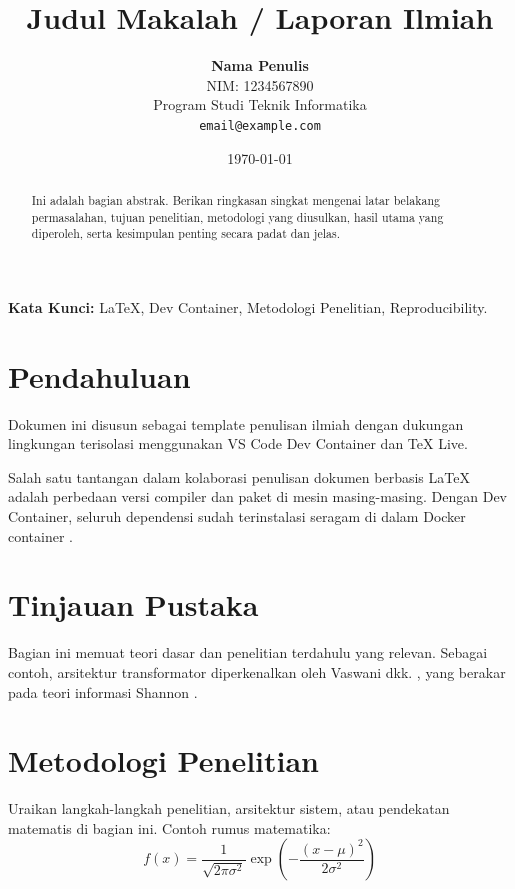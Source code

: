 \documentclass[12pt,a4paper]{article}
\title{\textbf{Judul Makalah / Laporan Ilmiah}}
\author{
    \textbf{Nama Penulis} \\
    NIM: 1234567890 \\
    Program Studi Teknik Informatika \\
    \texttt{email@example.com}
}
\date{\today}
\begin{document}
\maketitle

\begin{abstract}
Ini adalah bagian abstrak. Berikan ringkasan singkat mengenai latar belakang permasalahan, tujuan penelitian, metodologi yang diusulkan, hasil utama yang diperoleh, serta kesimpulan penting secara padat dan jelas.
\end{abstract}

\textbf{Kata Kunci:} LaTeX, Dev Container, Metodologi Penelitian, Reproducibility.

\section{Pendahuluan}
Dokumen ini disusun sebagai template penulisan ilmiah dengan dukungan lingkungan terisolasi menggunakan VS Code Dev Container dan TeX Live.

Salah satu tantangan dalam kolaborasi penulisan dokumen berbasis \LaTeX{} adalah perbedaan versi compiler dan paket di mesin masing-masing. Dengan Dev Container, seluruh dependensi sudah terinstalasi seragam di dalam Docker container \cite{knuth1984texbook}.

\section{Tinjauan Pustaka}
Bagian ini memuat teori dasar dan penelitian terdahulu yang relevan. Sebagai contoh, arsitektur transformator diperkenalkan oleh Vaswani dkk. \cite{vaswani2017attention}, yang berakar pada teori informasi Shannon \cite{shannon1948mathematical}.

\section{Metodologi Penelitian}
Uraikan langkah-langkah penelitian, arsitektur sistem, atau pendekatan matematis di bagian ini. Contoh rumus matematika:
\begin{equation}
    f(x) = \frac{1}{\sqrt{2\pi\sigma^2}} \exp\left(-\frac{(x - \mu)^2}{2\sigma^2}\right)
\end{equation}
\end{document}
